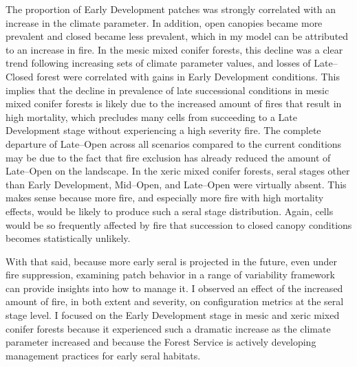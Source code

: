 The proportion of Early Development patches was strongly correlated with an increase in the climate parameter. In addition, open canopies became more prevalent and closed became less prevalent, which in my model can be attributed to an increase in fire. In the mesic mixed conifer forests, this decline was a clear trend following increasing sets of climate parameter values, and losses of Late--Closed forest were correlated with gains in Early Development conditions. This implies that the decline in prevalence of late successional conditions in mesic mixed conifer forests is likely due to the increased amount of fires that result in high mortality, which precludes many cells from succeeding to a Late Development stage without experiencing a high severity fire. The complete departure of Late--Open across all scenarios compared to the current conditions may be due to the fact that fire exclusion has already reduced the amount of Late--Open on the landscape. In the xeric mixed conifer forests, seral stages other than Early Development, Mid--Open, and Late--Open were virtually absent. This makes sense because more fire, and especially more fire with high mortality effects, would be likely to produce such a seral stage distribution. Again, cells would be so frequently affected by fire that succession to closed canopy conditions becomes statistically unlikely.

With that said, because more early seral is projected in the future, even under fire suppression, examining patch behavior in a range of variability framework can provide insights into how to manage it. I observed an effect of the increased amount of fire, in both extent and severity, on configuration metrics at the seral stage level. I focused on the Early Development stage in mesic and xeric mixed conifer forests because it experienced such a dramatic increase as the climate parameter increased and because the Forest Service is actively developing management practices for early seral habitats. 

